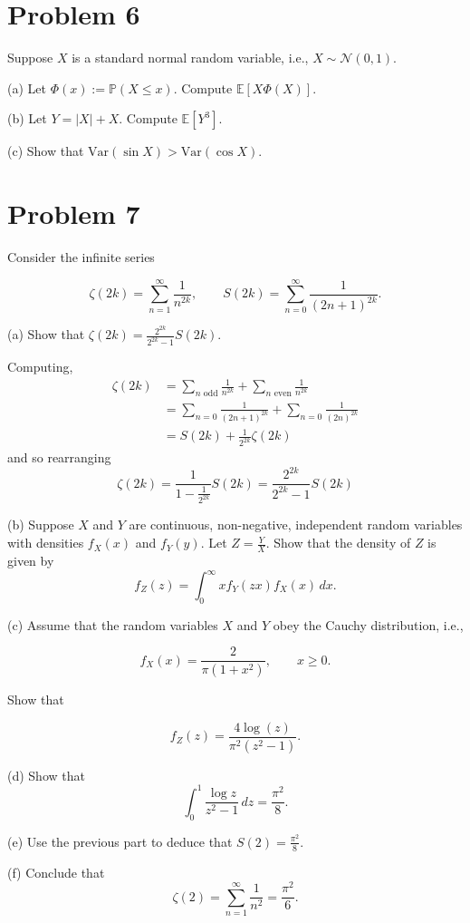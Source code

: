 \documentclass[11pt]{article}
\begin{document}
\section*{Problem 6}
Suppose \(X\) is a standard normal random variable, i.e., \(X \sim \mathcal{N}(0,1)\).

(a) Let \(\Phi(x) := \mathbb{P}(X \leq x)\). Compute \(\mathbb{E}[X \Phi(X)]\).

(b) Let \(Y = |X| + X\). Compute \(\mathbb{E}[Y^3]\).

(c) Show that \(\text{Var}(\sin X) > \text{Var}(\cos X)\).

\newpage

\section*{Problem 7}
Consider the infinite series

\[
\zeta(2k) = \sum_{n=1}^\infty \frac{1}{n^{2k}}, \qquad S(2k) = \sum_{n=0}^\infty \frac{1}{(2n + 1)^{2k}}.
\]

(a) Show that \(\zeta(2k) = \frac{2^{2k}}{2^{2k} - 1} S(2k)\).

\begin{solution}
Computing,
\begin{align*}
\zeta(2k) &= \sum_{n\text{ odd}} \frac{1}{n^{2k}} + \sum_{n \text{ even}} \frac{1}{n^{2k}}\\ &= \sum_{n=0} \frac{1}{(2n + 1)^{2k}} + \sum_{n=0}\frac{1}{(2n)^{2k}}  \\
&= S(2k) + \frac{1}{2^{2k}}\zeta(2k)
\end{align*}
and so rearranging
\[\zeta(2k) = \frac{1}{1-\frac{1}{2^{2k}}}S(2k) = \frac{2^{2k}}{2^{2k} - 1}S(2k)\]

\end{solution}


(b) Suppose \(X\) and \(Y\) are continuous, non-negative, independent random variables with densities \(f_X(x)\) and \(f_Y(y)\). Let \(Z = \frac{Y}{X}\). Show that the density of \(Z\) is given by
\[
f_Z(z) = \int_0^\infty x f_Y(zx) f_X(x) \, dx.
\]

(c) Assume that the random variables \(X\) and \(Y\) obey the Cauchy distribution, i.e.,

\[
f_X(x) = \frac{2}{\pi (1 + x^2)}, \qquad x \geq 0.
\]

Show that

\[
f_Z(z) = \frac{4 \log(z)}{\pi^2 (z^2 - 1)}.
\]

(d) Show that
\[
\int_0^1 \frac{\log z}{z^2 - 1} \, dz = \frac{\pi^2}{8}.
\]

(e) Use the previous part to deduce that \(S(2) = \frac{\pi^2}{8}\).

(f) Conclude that
\[
\zeta(2) = \sum_{n=1}^\infty \frac{1}{n^2} = \frac{\pi^2}{6}.
\]
\end{document}
